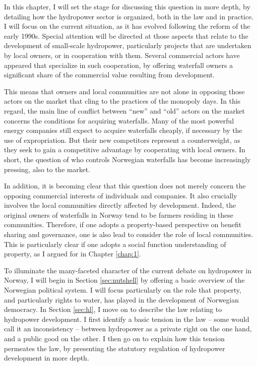 In this chapter, I will set the stage for discussing this question in more depth, by detailing how the hydropower sector is organized, both in the law and in practice. I will focus on the current situation, as it has evolved following the reform of the early 1990s. Special attention will be directed at those aspects that relate to the development of small-scale hydropower, particularly projects that are undertaken by local owners, or in cooperation with them. Several commercial actors have appeared that specialize in such cooperation, by offering waterfall owners a significant share of the commercial value resulting from development. 

This means that owners and local communities are not alone in opposing those actors on the market that cling to the practices of the monopoly days. In this regard, the main line of conflict between ``new'' and ``old'' actors on the market concerns the conditions for acquiring waterfalls. Many of the most powerful energy companies still expect to acquire waterfalls cheaply, if necessary by the use of expropriation. But their new competitors represent a counterweight, as they seek to gain a competitive advantage by cooperating with local owners. In short, the question of who controls Norwegian waterfalls has become increasingly pressing, also to the market.

In addition, it is becoming clear that this question does not merely concern the opposing commercial interests of individuals and companies. It also crucially involves the local communities directly affected by development. Indeed, the original owners of waterfalls in Norway tend to be farmers residing in these communities. Therefore, if one adopts a property-based perspective on benefit sharing and governance, one is also lead to consider the role of local communities. This is particularly clear if one adopts a social function understanding of property, as I argued for in Chapter \ref{chap:1}.

To illuminate the many-faceted character of the current debate on hydropower in Norway, I will begin in Section \ref{sec:nutshell} by offering a basic overview of the Norwegian political system. I will focus particularly on the role that property, and particularly rights to water, has played in the development of Norwegian democracy. In Section \ref{sec:hl}, I move on to describe the law relating to hydropower development. I first identify a basic tension in the law -- some would call it an inconsistency -- between hydropower as a private right on the one hand, and a public good on the other. I then go on to explain how this tension permeates the law, by presenting the statutory regulation of hydropower development in more depth.

